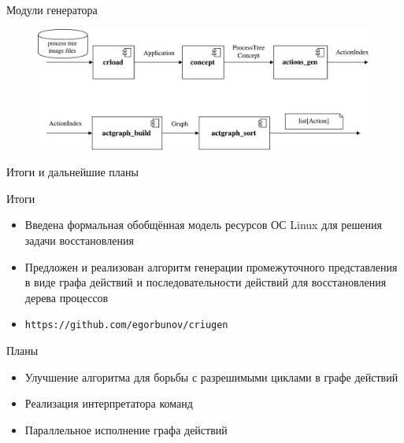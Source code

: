 \begin{frame}{Модули генератора}
	\begin{figure}[ht!]
	\centering
	\includegraphics[width=\textwidth]{fig/flow}
	\end{figure}
\end{frame}


\begin{frame}{Итоги и дальнейшие планы}
\begin{block}{Итоги}
\begin{itemize}
\item Введена формальная обобщённая модель ресурсов ОС Linux для решения задачи восстановления
\item Предложен и реализован алгоритм генерации промежуточного представления в виде графа действий и последовательности действий для восстановления дерева процессов
\item \texttt{https://github.com/egorbunov/criugen}
\end{itemize}
\end{block}

\begin{block}{Планы}
\begin{itemize}
\item Улучшение алгоритма для борьбы с разрешимыми циклами в графе действий
\item Реализация интерпретатора команд
\item Параллельное исполнение графа действий
\end{itemize}
\end{block}

\end{frame}


\backupbegin

\appendix

\bgroup
{}
\begin{frame}[plain]{}
\end{frame}
\egroup

